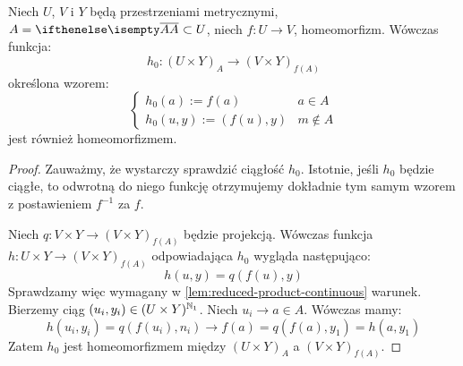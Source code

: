 \begin{lem} \label{lem:reduced-product-homeo}
  Niech $U$, $V$ i $Y$ będą przestrzeniami metrycznymi, $A = \cl A \subset U$, niech  $f: U \to V$, homeomorfizm. Wówczas funkcja:
  \[
    h_0: (U \times Y)_A \to (V \times Y)_{f(A)}
  \]
  określona wzorem:
  \[
    \begin{cases}
      h_0(a) := f(a)& a\in A \\
      h_0(u,y) := (f(u), y)& m\not\in A
    \end{cases}
  \]
  jest również homeomorfizmem.
  \begin{proof}
    Zauważmy, że wystarczy sprawdzić ciągłość $h_0$. Istotnie, jeśli $h_0$ będzie ciągłe, to odwrotną do niego funkcję otrzymujemy dokładnie tym samym wzorem z postawieniem $f^{-1}$ za $f$.

    Niech $q: V\times Y \to (V\times Y)_{f(A)}$ będzie projekcją. Wówczas funkcja $h: U\times Y \to (V\times Y)_{f(A)}$ odpowiadająca $h_0$ wygląda następująco:
    \[
      h(u,y) = q(f(u),y)
    \]
    Sprawdzamy więc wymagany w \ref{lem:reduced-product-continuous} warunek. Bierzemy ciąg $(u_i, y_i) \in (U\times Y)^{\mathbb{N}_1}$. Niech $u_i \to a \in A$. Wówczas mamy:
    \[
      h(u_i,y_i) = q(f(u_i), n_i) \to f(a) = q(f(a),y_1) = h(a,y_1)
    \]
    Zatem $h_0$ jest homeomorfizmem między $(U \times Y)_A$ a $(V \times Y)_{f(A)}$.
  \end{proof}
\end{lem}

